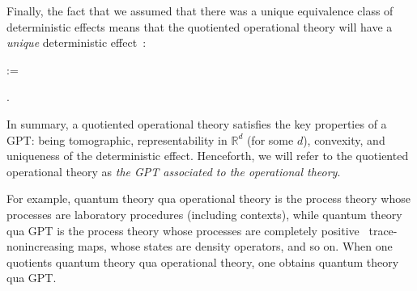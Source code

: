 \documentclass[onecolum,aps,groupedaddress,nofootinbib]{revtex4-2}
\begin{document}
Finally, the fact that we assumed that there was a unique equivalence class of deterministic effects means that the quotiented operational theory will have a {\em unique} deterministic effect~\cite{chiribella2010probabilistic}:
\beq
{}
\quad :=\quad
{}.
\eeq

In summary, a quotiented operational theory satisfies the key properties of a GPT: being tomographic,
 representability in $\mathds{R}^d$ (for some $d$), convexity, and uniqueness of the deterministic effect. Henceforth, we will refer to the quotiented operational theory as {\em the GPT associated to the operational theory}.

For example, quantum theory qua operational theory is the process theory whose processes are laboratory procedures (including contexts), while quantum theory qua GPT is the process theory whose processes are completely positive~\cite{NielsenAndChuang,Schmidcausal} trace-nonincreasing maps, whose states are density operators, and so on. When one quotients quantum theory qua operational theory, one obtains quantum theory qua GPT.
\end{document}
